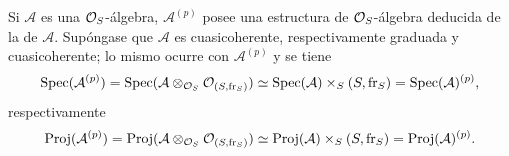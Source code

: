 Si $\mathcal{A}$ es una $\mathcal{O}_S$-álgebra, $\mathcal{A}^{(p)}$ posee una estructura de $\mathcal{O}_S$-álgebra deducida de la de $\mathcal{A}$. Supóngase que $\mathcal{A}$ es cuasicoherente, respectivamente graduada y cuasicoherente; lo mismo ocurre con $\mathcal{A}^{(p)}$ y se tiene
\[
\operatorname{Spec}(\mathcal{A}^{(p)})=\operatorname{Spec}(\mathcal{A}\otimes_{\mathcal{O}_S}\mathcal{O}_{(S,\operatorname{fr}_S)})
 \simeq \operatorname{Spec}(\mathcal{A})\times_S(S,\operatorname{fr}_S)=\operatorname{Spec}(\mathcal{A})^{(p)},
\]
respectivamente
\[
\operatorname{Proj}(\mathcal{A}^{(p)})=\operatorname{Proj}(\mathcal{A}\otimes_{\mathcal{O}_S}\mathcal{O}_{(S,\operatorname{fr}_S)})
 \simeq \operatorname{Proj}(\mathcal{A})\times_S(S,\operatorname{fr}_S)=\operatorname{Proj}(\mathcal{A})^{(p)}.
\]
